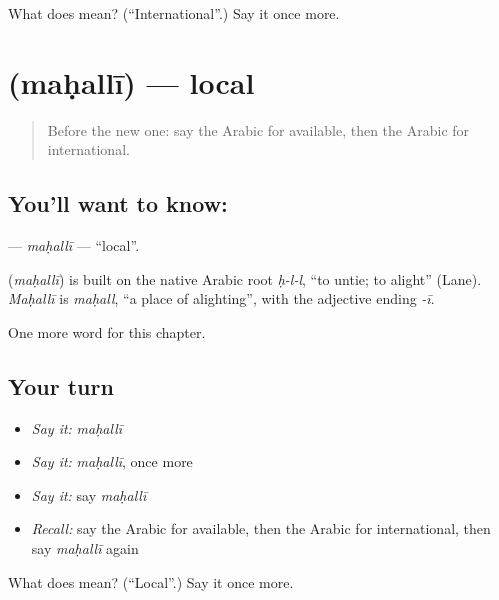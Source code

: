\begin{tcolorbox}[breakable,colback=teal!4,colframe=teal!35!black,title={Before you move on}]
What does  mean? (\textquotedblleft{}International\textquotedblright{}.) Say it once more.
\end{tcolorbox}
\section[\texorpdfstring{\ar{محلي} (maḥallī)}{محلي (maḥallī)}]{ (maḥallī) — local}

\label{lesson:AR-C270-mahalli}



\begin{quote}
Before the new one: say the Arabic for available, then the Arabic for international.
\end{quote}

\subsection*{You'll want to know: }
\textbf{} — \emph{maḥallī} — \textquotedblleft{}local\textquotedblright{}.

\begin{cousinweb}
\textbf{} (\emph{maḥallī}) is built on the native Arabic root \emph{ḥ-l-l}, \textquotedblleft{}to untie; to alight\textquotedblright{} (Lane). \emph{Maḥallī} is \emph{maḥall}, \textquotedblleft{}a place of alighting\textquotedblright{}, with the adjective ending \emph{-ī}.
\end{cousinweb}

\begin{grammarlens}[title={What you've built}]
One more word for this chapter.
\end{grammarlens}

\subsection*{Your turn}
\begin{itemize}
\raggedright
  \item \emph{Say it:} \emph{maḥallī}
  \item \emph{Say it:} \emph{maḥallī}, once more
  \item \emph{Say it:} say \emph{maḥallī}
  \item \emph{Recall:} say the Arabic for available, then the Arabic for international, then say \emph{maḥallī} again
\end{itemize}

\begin{tcolorbox}[breakable,colback=teal!4,colframe=teal!35!black,title={Before you move on}]
What does  mean? (\textquotedblleft{}Local\textquotedblright{}.) Say it once more.
\end{tcolorbox}
